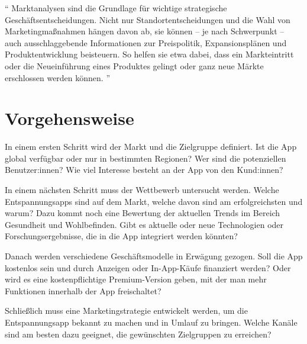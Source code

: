 "`
Marktanalysen sind die Grundlage für wichtige strategische Geschäftsentscheidungen. 
Nicht nur Standortentscheidungen und die Wahl von Marketingmaßnahmen hängen davon ab, sie können – je nach 
Schwerpunkt – auch ausschlaggebende Informationen zur Preispolitik, Expansionsplänen und Produktentwicklung 
beisteuern. So helfen sie etwa dabei, dass ein Markteintritt oder die Neueinführung eines Produktes gelingt
oder ganz neue Märkte erschlossen werden können. 
"'
\cite{marktanalyse}

\section{Vorgehensweise}

In einem ersten Schritt wird der Markt und die Zielgruppe definiert. 
Ist die App global verfügbar oder nur in bestimmten Regionen? Wer sind die potenziellen Benutzer:innen?
Wie viel Interesse besteht an der App von den Kund:innen?

In einem nächsten Schritt muss der Wettbewerb untersucht werden.
Welche Entspannungsapps sind auf dem Markt, welche davon sind am erfolgreichsten und warum?
Dazu kommt noch eine Bewertung der aktuellen Trends im Bereich Gesundheit und Wohlbefinden. 
Gibt es aktuelle oder neue Technologien oder Forschungsergebnisse, die in die App integriert werden könnten?

Danach werden verschiedene Geschäftsmodelle in Erwägung gezogen. 
Soll die App kostenlos sein und durch Anzeigen oder In-App-Käufe finanziert werden? 
Oder wird es eine kostenpflichtige Premium-Version geben, mit der man mehr Funktionen innerhalb der App freischaltet?

Schließlich muss eine Marketingstrategie entwickelt werden, um die Entspannungsapp bekannt zu machen und
in Umlauf zu bringen. 
Welche Kanäle sind am besten dazu geeignet, die gewünschten Zielgruppen zu erreichen?


